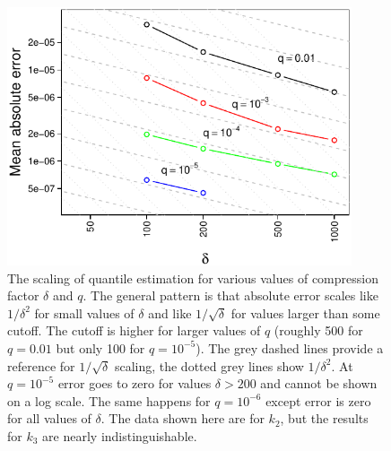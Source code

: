 \documentclass[]{statsoc}
\begin{document}
\begin{figure}[p] %
   \centering
   \includegraphics[width=4in]{error-vs-compression.pdf} 
   \caption{The scaling of quantile estimation for various values of compression factor $\delta$ and $q$. 
   The general pattern is that absolute error scales like $1/\delta^2$ for small values of $\delta$ and like $1/\sqrt{\delta}$ for values larger than some cutoff. The cutoff is higher for larger values of $q$ (roughly 500 for $q=0.01$ but only 100 for $q=10^{-5}$). The grey dashed lines provide a reference for $1/\sqrt{\delta}$ scaling, the dotted grey lines show $1/\delta^2$.   At $q=10^{-5}$ error goes to zero for values $\delta > 200$ and cannot be shown on a log scale. The same happens for $q=10^{-6}$ except error is zero for all values of $\delta$. The data shown here are for $k_2$, but the results for $k_3$ are nearly indistinguishable.}
   \label{fig:accuracy-scaling}
\end{figure}
\end{document}
